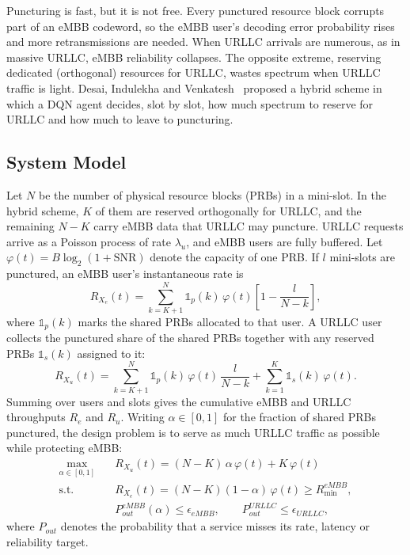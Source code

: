 Puncturing is fast, but it is not free. Every punctured resource block corrupts part of an eMBB codeword, so the eMBB user's decoding error probability rises and more retransmissions are needed. When URLLC arrivals are numerous, as in massive URLLC, eMBB reliability collapses. The opposite extreme, reserving dedicated (orthogonal) resources for URLLC, wastes spectrum when URLLC traffic is light. Desai, Indulekha and Venkatesh~\cite{ml_dqn2025} proposed a hybrid scheme in which a DQN agent decides, slot by slot, how much spectrum to reserve for URLLC and how much to leave to puncturing.

\subsection{System Model}
Let $N$ be the number of physical resource blocks (PRBs) in a mini-slot. In the hybrid scheme, $K$ of them are reserved orthogonally for URLLC, and the remaining $N-K$ carry eMBB data that URLLC may puncture. URLLC requests arrive as a Poisson process of rate $\lambda_u$, and eMBB users are fully buffered. Let $\varphi(t)=B\log_2(1+\mathrm{SNR})$ denote the capacity of one PRB. If $l$ mini-slots are punctured, an eMBB user's instantaneous rate is
\begin{equation}
  R_{X_e}(t)=\sum_{k=K+1}^{N}\mathbb{1}_p(k)\,\varphi(t)\left[1-\frac{l}{N-k}\right],
  \label{eq:ml_dqn_embb}
\end{equation}
where $\mathbb{1}_p(k)$ marks the shared PRBs allocated to that user. A URLLC user collects the punctured share of the shared PRBs together with any reserved PRBs $\mathbb{1}_s(k)$ assigned to it:
\begin{equation}
  R_{X_u}(t)=\sum_{k=K+1}^{N}\mathbb{1}_p(k)\,\varphi(t)\,\frac{l}{N-k}+\sum_{k=1}^{K}\mathbb{1}_s(k)\,\varphi(t).
  \label{eq:ml_dqn_urllc}
\end{equation}
Summing over users and slots gives the cumulative eMBB and URLLC throughputs $R_e$ and $R_u$. Writing $\alpha\in[0,1]$ for the fraction of shared PRBs punctured, the design problem is to serve as much URLLC traffic as possible while protecting eMBB:
\begin{equation}
\begin{aligned}
  \max_{\alpha\in[0,1]}\quad & R_{X_u}(t)=(N-K)\,\alpha\,\varphi(t)+K\,\varphi(t) \\
  \text{s.t.}\quad & R_{X_e}(t)=(N-K)(1-\alpha)\,\varphi(t)\ge R^{eMBB}_{\min}, \\
  & P^{eMBB}_{out}(\alpha)\le\epsilon_{eMBB},\qquad P^{URLLC}_{out}\le\epsilon_{URLLC},
\end{aligned}
\end{equation}
where $P_{out}$ denotes the probability that a service misses its rate, latency or reliability target.

